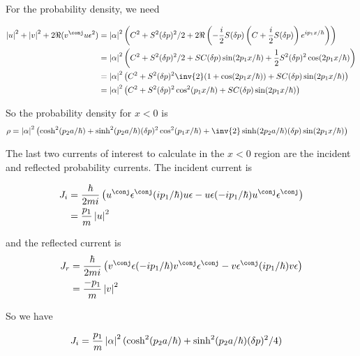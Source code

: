 For the probability density, we need

\begin{align*}
\Abs{u}^2 + \Abs{v}^2 + 2 \Re(v^\conj u \epsilon^2) 
&=
\Abs{\alpha}^2 \left(C^2 + S^2 (\delta p)^2/2 
+ 2\Re\left(
-\frac{i}{2} S (\delta p) \left(C + \frac{i}{2} S (\delta p)\right) e^{i p_1 x/\hbar}
\right)\right) \\
&=
\Abs{\alpha}^2 \left(C^2 + S^2 (\delta p)^2/2 
+ S C (\delta p) \sin( 2 p_1 x/\hbar)
+\frac{1}{2} S^2 (\delta p)^2 \cos( 2 p_1 x/\hbar)
\right) \\
&=
\Abs{\alpha}^2 \left(C^2 + S^2 (\delta p)^2 \inv{2}(1 + \cos( 2 p_1 x/\hbar))
+ S C (\delta p) \sin( 2 p_1 x/\hbar)
\right) \\
&=
\Abs{\alpha}^2 \left(C^2 + S^2 (\delta p)^2 \cos^2( p_1 x/\hbar)
+ S C (\delta p) \sin( 2 p_1 x/\hbar)
\right) \\
\end{align*}

So the probability density for $x<0$ is
\begin{align}
\rho 
&=
\Abs{\alpha}^2 \left(\cosh^2(p_2 a/\hbar) + \sinh^2(p_2 a/\hbar) (\delta p)^2 \cos^2( p_1 x/\hbar)
+ \inv{2} \sinh(2 p_2 a/\hbar) (\delta p) \sin( 2 p_1 x/\hbar)
\right)
\end{align}

The last two currents of interest to calculate in the $x<0$ region are the incident and reflected probability currents.  The
incident current is

\begin{align*}
J_i 
&=
\frac{\hbar}{2m i}\left( 
u^\conj \epsilon^\conj (ip_1/\hbar) u \epsilon
-u \epsilon (-ip_1/\hbar) u^\conj \epsilon^\conj 
\right)
\\
&=
\frac{p_1}{m} \Abs{u}^2
\end{align*}

and the reflected current is
\begin{align*}
J_r 
&=
\frac{\hbar}{2m i}\left( 
v^\conj \epsilon (-ip_1/\hbar) v^\conj \epsilon^\conj
-v \epsilon^\conj (ip_1/\hbar) v \epsilon
\right) \\
&=
\frac{-p_1}{m} \Abs{v}^2
\end{align*}

So we have

\begin{align}\label{eqn:qmb_first_try:JiBarrier}
J_i
&= \frac{p_1}{m} \left\lvert{\alpha}\right\rvert^2 (\cosh^2(p_2 a/\hbar) + \sinh^2(p_2 a/\hbar) (\delta p)^2/4)
\end{align}

